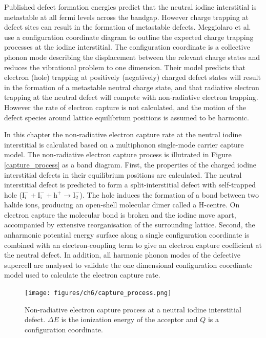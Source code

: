 Published defect formation energies predict that the neutral iodine interstitial is metastable at all fermi levels across the bandgap.
However charge trapping at defect sites can result in the formation of metastable defects.
Meggiolaro et al.\autocite{} use a configuration coordinate diagram to outline the expected charge trapping processes at the iodine interstitial. 
The configuration coordinate is a collective phonon mode describing the displacement between the relevant charge states and reduces the vibrational problem to one dimension.
Their model predicts that electron (hole) trapping at positively (negatively) charged defect states will result in the formation of a metastable neutral charge state, and that radiative electron trapping at the neutral defect will compete with non-radiative electron trapping.
However the rate of electron capture is not calculated, and the motion of the defect species around lattice equilibrium positions is assumed to be harmonic.

In this chapter the non-radiative electron capture rate at the neutral iodine interstitial is calculated based on a multiphonon single-mode carrier capture model.  The non-radiative electron capture process is illutrated in Figure \ref{capture_process} as a band diagram. First, the properties of the charged iodine interstitial defects in their equilibrium positions are calculated. The neutral interstitial defect is predicted to form a split-interstitial defect with self-trapped hole ($\mathrm{I}_\mathrm{i}^-+\mathrm{I}_\mathrm{i}^-+\mathrm{h}^+ \rightarrow \mathrm{I}_\mathrm{2}^-$). The hole induces the formation of a bond between two halide ions, producing an open-shell molecular dimer called a H-centre. On electron capture the molecular bond is broken and the iodine move apart, accompanied by extensive reorganisation of the surrounding lattice. Second, the anharmonic potential energy surface along a single configuration coordinate is combined with an electron-coupling term to give an electron capture coefficient at the neutral defect.
In addition, all harmonic phonon modes of the defective supercell are analysed to validate the one dimensional configuration coordinate model used to calculate the electron capture rate.

\begin{figure}[h!]
\centering
  \texttt{[image: figures/ch6/capture\_process.png]}
  \caption[Non-radiative electron capture process at an iodine interstitial defect]{Non-radiative electron capture process at a neutral iodine interstitial defect. $\Delta E$ is the ionization energy of the acceptor and $Q$ is a configuration coordinate.}
\end{figure}

